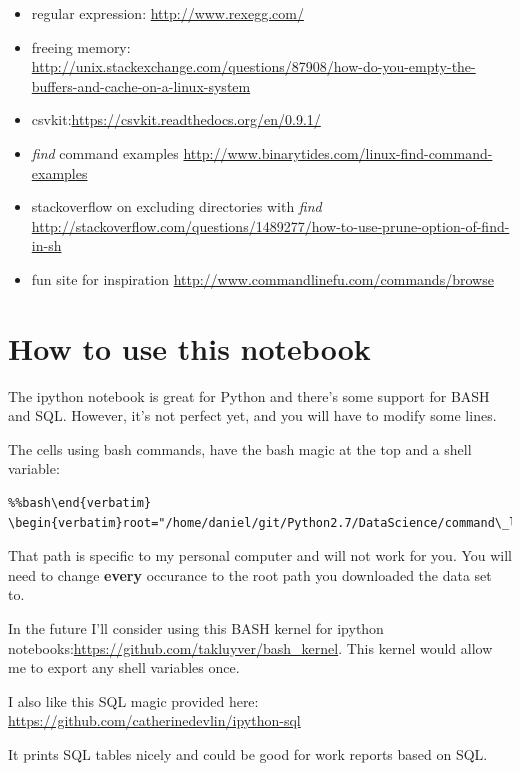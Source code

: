 \documentclass{article}
\begin{document}
\begin{itemize}
\itemsep1pt\parskip0pt
\item
    regular expression: \url{http://www.rexegg.com/}
\item
  freeing memory: \\
  \url{http://unix.stackexchange.com/questions/87908/how-do-you-empty-the-buffers-and-cache-on-a-linux-system}
\item
    csvkit:\url{https://csvkit.readthedocs.org/en/0.9.1/}
\item
  \emph{find} command examples
  \url{http://www.binarytides.com/linux-find-command-examples}
\item
  stackoverflow on excluding directories with \emph{find}
  \url{http://stackoverflow.com/questions/1489277/how-to-use-prune-option-of-find-in-sh}
\item
    fun site for inspiration \url{http://www.commandlinefu.com/commands/browse}
\end{itemize}

\section{How to use this notebook}\label{how-to-use-this-notebook}

The ipython notebook is great for Python and there's some support for
BASH and SQL. However, it's not perfect yet, and you will have to modify
some lines.

The cells using bash commands, have the bash magic at the top and a
shell variable:
\begin{verbatim}%%bash\end{verbatim}
\begin{verbatim}root="/home/daniel/git/Python2.7/DataScience/command\_line\_pres\_data"\end{verbatim}

    That path is specific to my personal computer and will not work for you.
You will need to change \textbf{every} occurance to the root path you
downloaded the data set to.

In the future I'll consider using this BASH kernel for ipython
notebooks:\url{https://github.com/takluyver/bash\_kernel}. This kernel would
allow me to export any shell variables once.

I also like this SQL magic provided here:
\url{https://github.com/catherinedevlin/ipython-sql}

It prints SQL tables nicely and could be good for work reports based on
SQL.
\end{document}
